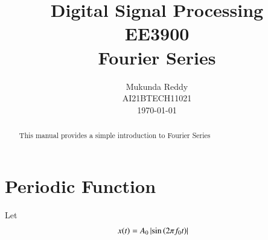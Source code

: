 \documentclass[journal,12pt,twocolumn]{IEEEtran}
\begin{document}
\title{ Digital Signal Processing \\ \Large EE3900 \\ \vspace*{12pt} \textbf{Fourier Series}}
\author{Mukunda Reddy\\ \normalsize AI21BTECH11021 \\ \vspace*{20pt} \normalsize \today}
 \maketitle 
 \tableofcontents
 \begin{abstract}
    This manual provides a simple introduction to Fourier Series
    \end{abstract}
    \section{Periodic Function}
    Let 
    \begin{align}
        x(t) &= A_0\left\vert\sin\left(2\pi f_0 t\right)\right\vert
        \label{eq:x(t)}
    \end{align}
\end{document}
